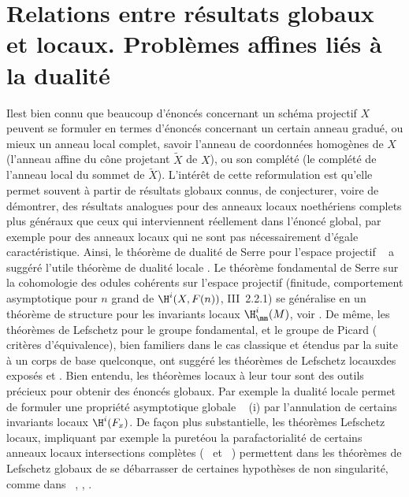 \section[Relations entre r\'esultats globaux et locaux]
{Relations entre r\'esultats globaux et locaux. Probl\`emes affines li\'es \`a la dualit\'e} \label{XIII.1}

Il\pageoriginale est bien connu que beaucoup d'\'enonc\'es concernant un sch\'ema
projectif $X$ peuvent se formuler en termes d'\'enonc\'es concernant
un certain anneau gradu\'e, ou mieux un anneau local complet,
 savoir l'anneau de coordonn\'ees homog\`enes
de $X$ (\ie l'anneau affine du c\^{o}ne projetant $\tilde{X}$ de
$X$), ou son compl\'et\'e (\ie le compl\'et\'e de l'anneau local du sommet
de $\tilde{X}$). L'int\'er\^et de cette reformulation est qu'elle
permet souvent \`a partir de r\'esultats globaux connus, de
conjecturer, voire de d\'emontrer, des r\'esultats analogues pour des
anneaux locaux noeth\'eriens complets plus g\'en\'eraux que ceux qui
interviennent r\'eellement dans l'\'enonc\'e global, par exemple pour
des anneaux locaux qui ne sont pas n\'ecessairement d'\'egale
caract\'eristique. Ainsi, le th\'eor\`eme de dualit\'e de Serre pour
l'espace projectif ~ a sugg\'er\'e l'utile
th\'eor\`eme de dualit\'e locale . Le
th\'eor\`eme fondamental de Serre sur la cohomologie des
odules coh\'erents sur l'espace projectif (finitude,
comportement asymptotique pour $n$ grand de $\H^i(X,
F(n))$, {\cf \EGA III~2.2.1}) se g\'en\'eralise en un th\'eor\`eme de
structure pour les invariants locaux $\H^i_{\mm}(M)$, voir
. De m\^eme, les th\'eor\`emes de
Lefschetz pour le groupe fondamental, et le groupe de Picard (\og
crit\`eres d'\'equivalence{\fg}), bien familiers dans le cas
classique et \'etendus par la suite \`a un corps de base quelconque,
ont sugg\'er\'e les th\'eor\`emes de Lefschetz \og locaux\fg des expos\'es
 et . Bien entendu, les th\'eor\`emes locaux \`a leur
tour sont des outils pr\'ecieux pour obtenir des \'enonc\'es globaux.
Par exemple la dualit\'e locale permet de formuler une propri\'et\'e
asymptotique globale ~ (i) par l'annulation
de certains invariants locaux $\H^i(F_x)$. De fa\c con plus
substantielle, les th\'eor\`emes Lefschetz locaux, impliquant par
exemple la \og puret\'e\fg ou la parafactorialit\'e de certains
anneaux locaux intersections compl\`etes (~ et
~) permettent dans les th\'eor\`emes de
Lefschetz globaux de se d\'ebarrasser de certaines hypoth\`eses de
non singularit\'e, comme dans ~, ,
.

